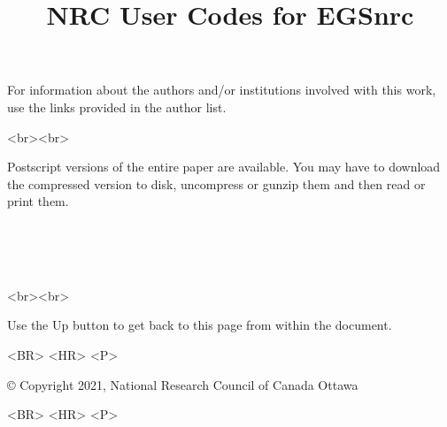 \documentclass[12pt,twoside]{article}  %
\begin{document}
\begin{htmlonly}
For information about the authors and/or institutions involved with this
work, use the links provided in the author list.\\

\begin{rawhtml}
<br><br>
\end{rawhtml}


Postscript versions of the entire paper are available.  You may have to
download the compressed version to disk, uncompress or gunzip them and
then read or print them.\\
\begin{center}
\\
\\
\\
\end{center}
\begin{rawhtml}
<br><br>
\end{rawhtml}

Use the Up button to get back to this page from within the document.
\begin{rawhtml}
<BR> <HR> <P>
\end{rawhtml}
\copyright
Copyright 2021,  National Research Council of Canada
Ottawa
\begin{rawhtml}
<BR> <HR> <P>
\end{rawhtml}
\end{htmlonly}

\pagestyle{empty}

\title{NRC User Codes for EGSnrc}
\end{document}
